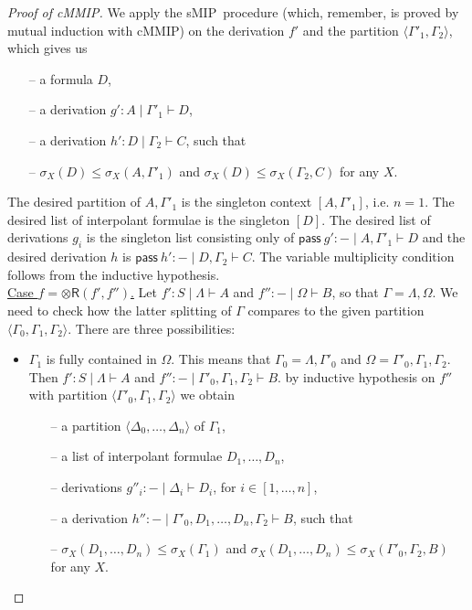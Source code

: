 \documentclass[sn-mathphys-num]{sn-jnl}%
\newcommand{\GG}{\Gamma}
\newcommand{\GD}{\Delta}
\newcommand{\GL}{\Lambda}
\newcommand{\GO}{\Omega}
\newcommand{\vd}{\vdash}
\newcommand{\tr}{\otimes\mathsf{R}}
\newcommand{\pass}{\mathsf{pass}}
\newcommand{\gs}[1]{\sigma_{X} (#1)}
\newcommand{\sMIP}{\textsf{sMIP}}
\newcommand{\cMMIP}{\textsf{cMMIP}}
\theoremstyle{thmstyleone}%
\theoremstyle{thmstyletwo}%
\theoremstyle{thmstylethree}%
\begin{document}
\begin{proof}[Proof of \cMMIP]
  We apply the \sMIP~procedure (which, remember, is proved by mutual induction with \cMMIP) on the derivation $f'$ and the partition $\langle \GG'_1,\GG_2 \rangle$, which gives us
  \begin{itemize}
    \item[--] a formula $D$,
    \item[--] a derivation $g': A \mid \GG'_1 \vd D$,
    \item[--] a derivation $h' : D \mid \GG_2 \vd C$, such that
    \item[--] $\gs{D} \leq \gs{A , \GG'_1}$ and $\gs{D} \leq \gs{\GG_2 , C}$ for any $X$.
  \end{itemize}
  The desired partition of $A,\GG'_1$ is the singleton context $[A,\GG'_1]$, i.e. $n = 1$.
  The desired list of interpolant formulae is the singleton $[D]$.
  The desired list of derivations $g_i$ is the singleton list consisting only of $\pass \ g' : {-} \mid A , \GG'_1 \vd D$ and the desired derivation $h$ is $\pass \ h' : {-} \mid D, \GG_2 \vd C$.
  The variable multiplicity condition follows from the inductive hypothesis.
  \\
  \underline{Case $f = \tr (f' , f'')$.}
  Let $f' : S \mid \GL \vd A$ and $f'' : {-} \mid \GO \vd B$, so that $\GG = \GL,\GO$.
  We need to check how the latter splitting of $\GG$ compares to the given partition $\langle \GG_0 , \GG_1, \GG_2 \rangle$.
  There are three possibilities:
  \begin{itemize}
    \item $\GG_1$ is fully contained in $\GO$.
    This means that $\GG_0 = \GL , \GG'_0$ and $\GO = \GG'_0 , \GG_1 , \GG_2$.
    Then $f' : S \mid \GL \vd A$ and $f'' : {-} \mid \GG'_0 , \GG_1 , \GG_2 \vd B$.
    by inductive hypothesis on $f''$ with partition $\langle \GG'_0 , \GG_1 , \GG_2 \rangle$ we obtain
    \begin{itemize}
      \item[--] a partition $\langle \GD_0, \dots , \GD_n \rangle$ of $\GG_1$,
      \item[--] a list of interpolant formulae $D_1, \dots , D_n$,
      \item[--] derivations $g''_i : {-} \mid \GD_i \vd D_i$, for $i \in [1,\dots , n]$,
      \item[--] a derivation $h'' : {-} \mid \GG'_0 , D_1 , \dots , D_n , \GG_2 \vd B$, such that
      \item[--] $\gs{D_1, \dots, D_n} \leq \gs{\GG_1}$ and $\gs{D_1, \dots, D_n} \leq \gs{\GG'_0 , \GG_2 , B}$ for any $X$.
    \end{itemize}

\end{itemize}
\end{proof}
\end{document}
